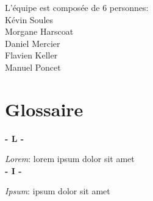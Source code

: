 L’équipe est composée de 6 personnes:\\
Kévin Soules\\
Morgane Harscoat\\
Daniel Mercier\\
Flavien Keller\\
Manuel Poncet\\

\section{Glossaire}
\noindent

\vskip 0.1cm
\textbf{- L -}\\
\vskip 0.1cm

\textit{Lorem}: lorem ipsum dolor sit amet\\

\vskip 0.1cm
\textbf{- I -}\\
\vskip 0.1cm

\textit{Ipsum}: ipsum dolor sit amet\\

